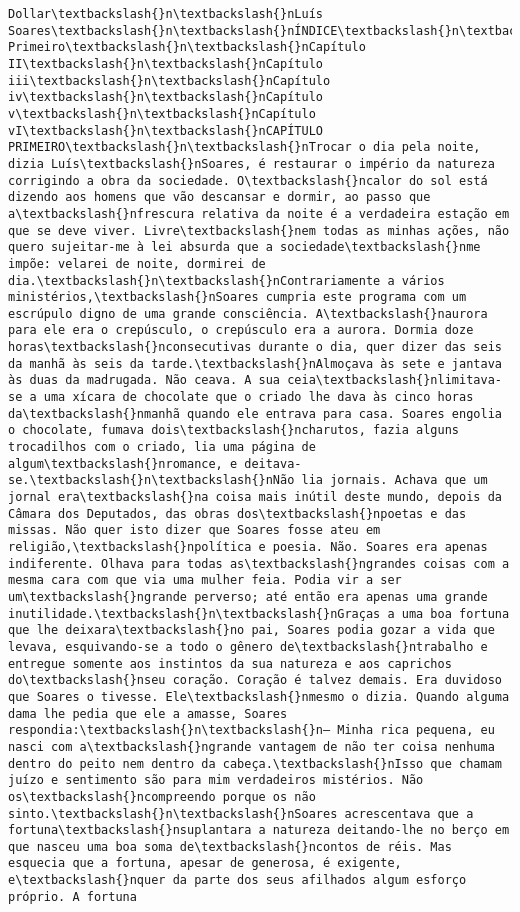 \documentclass[11pt]{article}
\begin{document}
\begin{Verbatim}[commandchars=\\\{\}]
Dollar\textbackslash{}n\textbackslash{}nLuís Soares\textbackslash{}n\textbackslash{}nÍNDICE\textbackslash{}n\textbackslash{}nCapítulo Primeiro\textbackslash{}n\textbackslash{}nCapítulo II\textbackslash{}n\textbackslash{}nCapítulo iii\textbackslash{}n\textbackslash{}nCapítulo iv\textbackslash{}n\textbackslash{}nCapítulo v\textbackslash{}n\textbackslash{}nCapítulo vI\textbackslash{}n\textbackslash{}nCAPÍTULO PRIMEIRO\textbackslash{}n\textbackslash{}nTrocar o dia pela noite, dizia Luís\textbackslash{}nSoares, é restaurar o império da natureza corrigindo a obra da sociedade. O\textbackslash{}ncalor do sol está dizendo aos homens que vão descansar e dormir, ao passo que a\textbackslash{}nfrescura relativa da noite é a verdadeira estação em que se deve viver. Livre\textbackslash{}nem todas as minhas ações, não quero sujeitar-me à lei absurda que a sociedade\textbackslash{}nme impõe: velarei de noite, dormirei de dia.\textbackslash{}n\textbackslash{}nContrariamente a vários ministérios,\textbackslash{}nSoares cumpria este programa com um escrúpulo digno de uma grande consciência. A\textbackslash{}naurora para ele era o crepúsculo, o crepúsculo era a aurora. Dormia doze horas\textbackslash{}nconsecutivas durante o dia, quer dizer das seis da manhã às seis da tarde.\textbackslash{}nAlmoçava às sete e jantava às duas da madrugada. Não ceava. A sua ceia\textbackslash{}nlimitava-se a uma xícara de chocolate que o criado lhe dava às cinco horas da\textbackslash{}nmanhã quando ele entrava para casa. Soares engolia o chocolate, fumava dois\textbackslash{}ncharutos, fazia alguns trocadilhos com o criado, lia uma página de algum\textbackslash{}nromance, e deitava-se.\textbackslash{}n\textbackslash{}nNão lia jornais. Achava que um jornal era\textbackslash{}na coisa mais inútil deste mundo, depois da Câmara dos Deputados, das obras dos\textbackslash{}npoetas e das missas. Não quer isto dizer que Soares fosse ateu em religião,\textbackslash{}npolítica e poesia. Não. Soares era apenas indiferente. Olhava para todas as\textbackslash{}ngrandes coisas com a mesma cara com que via uma mulher feia. Podia vir a ser um\textbackslash{}ngrande perverso; até então era apenas uma grande inutilidade.\textbackslash{}n\textbackslash{}nGraças a uma boa fortuna que lhe deixara\textbackslash{}no pai, Soares podia gozar a vida que levava, esquivando-se a todo o gênero de\textbackslash{}ntrabalho e entregue somente aos instintos da sua natureza e aos caprichos do\textbackslash{}nseu coração. Coração é talvez demais. Era duvidoso que Soares o tivesse. Ele\textbackslash{}nmesmo o dizia. Quando alguma dama lhe pedia que ele a amasse, Soares respondia:\textbackslash{}n\textbackslash{}n— Minha rica pequena, eu nasci com a\textbackslash{}ngrande vantagem de não ter coisa nenhuma dentro do peito nem dentro da cabeça.\textbackslash{}nIsso que chamam juízo e sentimento são para mim verdadeiros mistérios. Não os\textbackslash{}ncompreendo porque os não sinto.\textbackslash{}n\textbackslash{}nSoares acrescentava que a fortuna\textbackslash{}nsuplantara a natureza deitando-lhe no berço em que nasceu uma boa soma de\textbackslash{}ncontos de réis. Mas esquecia que a fortuna, apesar de generosa, é exigente, e\textbackslash{}nquer da parte dos seus afilhados algum esforço próprio. A fortuna 
\end{Verbatim}
\end{document}
